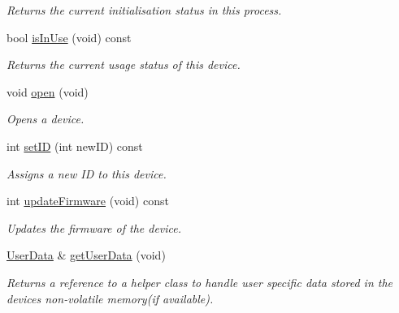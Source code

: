 \begin{DoxyCompactItemize}
\begin{DoxyCompactList}\small\item\em Returns the current initialisation status in this process. \end{DoxyCompactList}\item 
bool \hyperlink{classmv_i_m_p_a_c_t_1_1acquire_1_1_device_a300801d194f3800120140ad4bcdbcd1a}{is\+In\+Use} (void) const 
\begin{DoxyCompactList}\small\item\em Returns the current usage status of this device. \end{DoxyCompactList}\item 
void \hyperlink{classmv_i_m_p_a_c_t_1_1acquire_1_1_device_adf4cb4c232b202a51c7161caf9b36165}{open} (void)
\begin{DoxyCompactList}\small\item\em Opens a device. \end{DoxyCompactList}\item 
int \hyperlink{classmv_i_m_p_a_c_t_1_1acquire_1_1_device_a3cf73e03bb07320488a703a573f043ac}{set\+I\+D} (int new\+I\+D) const 
\begin{DoxyCompactList}\small\item\em Assigns a new I\+D to this device. \end{DoxyCompactList}\item 
int \hyperlink{classmv_i_m_p_a_c_t_1_1acquire_1_1_device_aa5584b58e68c8e3237b7fcdb698d36b7}{update\+Firmware} (void) const 
\begin{DoxyCompactList}\small\item\em Updates the firmware of the device. \end{DoxyCompactList}\item 
\hyperlink{classmv_i_m_p_a_c_t_1_1acquire_1_1_user_data}{User\+Data} \& \hyperlink{classmv_i_m_p_a_c_t_1_1acquire_1_1_device_a08734e0c6fd862e3c6e7160c66b927ec}{get\+User\+Data} (void)
\begin{DoxyCompactList}\small\item\em Returns a reference to a helper class to handle user specific data stored in the devices non-\/volatile memory(if available). \end{DoxyCompactList}\end{DoxyCompactItemize}
